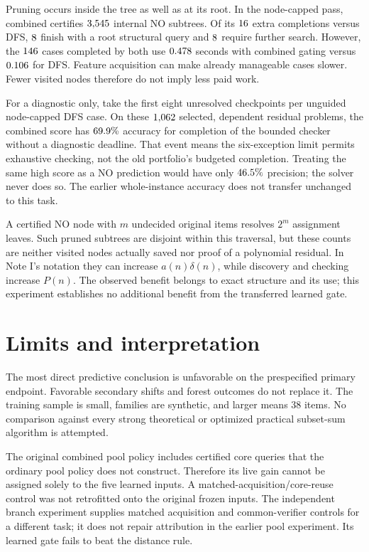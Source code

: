 \documentclass[10pt,english]{article}
\begin{document}
Pruning occurs inside the tree as well as at its root. In the node-capped pass, combined certifies \(3{,}545\) internal NO subtrees. Of its \(16\) extra completions versus DFS, \(8\) finish with a root structural query and \(8\) require further search. However, the \(146\) cases completed by both use \(0.478\) seconds with combined gating versus \(0.106\) for DFS. Feature acquisition can make already manageable cases slower. Fewer visited nodes therefore do not imply less paid work.

For a diagnostic only, take the first eight unresolved checkpoints per unguided node-capped DFS case. On these \(1{,}062\) selected, dependent residual problems, the combined score has \(69.9\%\) accuracy for completion of the bounded checker without a diagnostic deadline. That event means the six-exception limit permits exhaustive checking, not the old portfolio's budgeted completion. Treating the same high score as a NO prediction would have only \(46.5\%\) precision; the solver never does so. The earlier whole-instance accuracy does not transfer unchanged to this task.

A certified NO node with \(m\) undecided original items resolves \(2^m\) assignment leaves. Such pruned subtrees are disjoint within this traversal, but these counts are neither visited nodes actually saved nor proof of a polynomial residual. In Note I's notation they can increase \(a(n)\delta(n)\), while discovery and checking increase \(P(n)\). The observed benefit belongs to exact structure and its use; this experiment establishes no additional benefit from the transferred learned gate.

\section{Limits and interpretation}
The most direct predictive conclusion is unfavorable on the prespecified primary endpoint. Favorable secondary shifts and forest outcomes do not replace it. The training sample is small, families are synthetic, and larger means 38 items. No comparison against every strong theoretical or optimized practical subset-sum algorithm is attempted.

The original combined pool policy includes certified core queries that the ordinary pool policy does not construct. Therefore its live gain cannot be assigned solely to the five learned inputs. A matched-acquisition/core-reuse control was not retrofitted onto the original frozen inputs. The independent branch experiment supplies matched acquisition and common-verifier controls for a different task; it does not repair attribution in the earlier pool experiment. Its learned gate fails to beat the distance rule.
\end{document}
